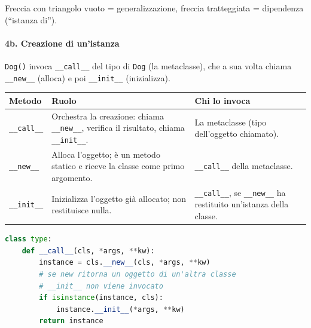 \documentclass[12pt]{extarticle}
\begin{document}
\noindent Freccia con triangolo vuoto = generalizzazione, freccia tratteggiata = dipendenza (``istanza di'').

\paragraph{4b. Creazione di un'istanza} \texttt{Dog()} invoca \texttt{\_\_call\_\_} del tipo di \texttt{Dog} (la metaclasse), che a sua volta chiama \texttt{\_\_new\_\_} (alloca) e poi \texttt{\_\_init\_\_} (inizializza).
\begin{center}
\small
\begin{tabular}{p{3.0cm}p{5.2cm}p{6.2cm}}
    \toprule
    \textbf{Metodo} & \textbf{Ruolo} & \textbf{Chi lo invoca} \\
    \midrule
    \texttt{\_\_call\_\_} & Orchestra la creazione: chiama \texttt{\_\_new\_\_}, verifica il risultato, chiama \texttt{\_\_init\_\_}. & La metaclasse (tipo dell'oggetto chiamato). \\
    \addlinespace
    \texttt{\_\_new\_\_} & Alloca l'oggetto; è un metodo statico e riceve la classe come primo argomento. & \texttt{\_\_call\_\_} della metaclasse. \\
    \addlinespace
    \texttt{\_\_init\_\_} & Inizializza l'oggetto già allocato; non restituisce nulla. & \texttt{\_\_call\_\_}, se \texttt{\_\_new\_\_} ha restituito un'istanza della classe. \\
    \bottomrule
\end{tabular}
\end{center}
\begin{lstlisting}[language=Python]
class type:
    def __call__(cls, *args, **kw):
        instance = cls.__new__(cls, *args, **kw)
        # se new ritorna un oggetto di un'altra classe
        # __init__ non viene invocato
        if isinstance(instance, cls):
            instance.__init__(*args, **kw)
        return instance
\end{lstlisting}
\begin{center}
\end{center}
\end{document}
